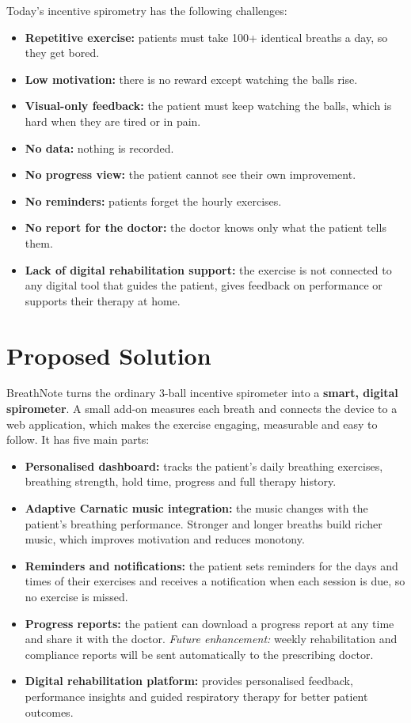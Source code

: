 \documentclass[12pt,a4paper]{article}
\begin{document}
Today's incentive spirometry has the following challenges:
\begin{itemize}
  \item \textbf{Repetitive exercise:} patients must take 100+ identical breaths a day, so they get bored.
  \item \textbf{Low motivation:} there is no reward except watching the balls rise.
  \item \textbf{Visual-only feedback:} the patient must keep watching the balls, which is hard when they are tired or in pain.
  \item \textbf{No data:} nothing is recorded.
  \item \textbf{No progress view:} the patient cannot see their own improvement.
  \item \textbf{No reminders:} patients forget the hourly exercises.
  \item \textbf{No report for the doctor:} the doctor knows only what the patient tells them.
  \item \textbf{Lack of digital rehabilitation support:} the exercise is not connected to any digital tool that guides the patient, gives feedback on performance or supports their therapy at home.
\end{itemize}

\section{Proposed Solution}
\label{sec:solution}

BreathNote turns the ordinary 3-ball incentive spirometer into a \textbf{smart, digital spirometer}. A small add-on measures each breath and connects the device to a web application, which makes the exercise engaging, measurable and easy to follow. It has five main parts:

\begin{itemize}
  \item \textbf{Personalised dashboard:} tracks the patient's daily breathing exercises, breathing strength, hold time, progress and full therapy history.
  \item \textbf{Adaptive Carnatic music integration:} the music changes with the patient's breathing performance. Stronger and longer breaths build richer music, which improves motivation and reduces monotony.
  \item \textbf{Reminders and notifications:} the patient sets reminders for the days and times of their exercises and receives a notification when each session is due, so no exercise is missed.
  \item \textbf{Progress reports:} the patient can download a progress report at any time and share it with the doctor. \emph{Future enhancement:} weekly rehabilitation and compliance reports will be sent automatically to the prescribing doctor.
  \item \textbf{Digital rehabilitation platform:} provides personalised feedback, performance insights and guided respiratory therapy for better patient outcomes.
\end{itemize}
\end{document}
